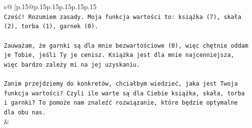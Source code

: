 \documentclass{article}
\begin{document}
{\begin{supertabular}{c@{$\;$}|p{.15\linewidth}@{}p{.15\linewidth}p{.15\linewidth}p{.15\linewidth}p{.15\linewidth}p{.15\linewidth}}
{{{\\ 
\texttt{Cześć! Rozumiem zasady. Moja funkcja wartości to: książka (7), skała (2), torba (1), garnek (0).} \\
\\ 
\texttt{Zauważam, że garnki są dla mnie bezwartościowe (0), więc chętnie oddam je Tobie, jeśli Ty je cenisz. Książka jest dla mnie najcenniejsza, więc bardzo zależy mi na jej uzyskaniu.} \\
\\ 
\texttt{Zanim przejdziemy do konkretów, chciałbym wiedzieć, jaka jest Twoja funkcja wartości? Czyli ile warte są dla Ciebie książka, skała, torba i garnki? To pomoże nam znaleźć rozwiązanie, które będzie optymalne dla obu nas.} \\
            }
        }
    }
    & \\ \\


\end{supertabular}}
\end{document}
